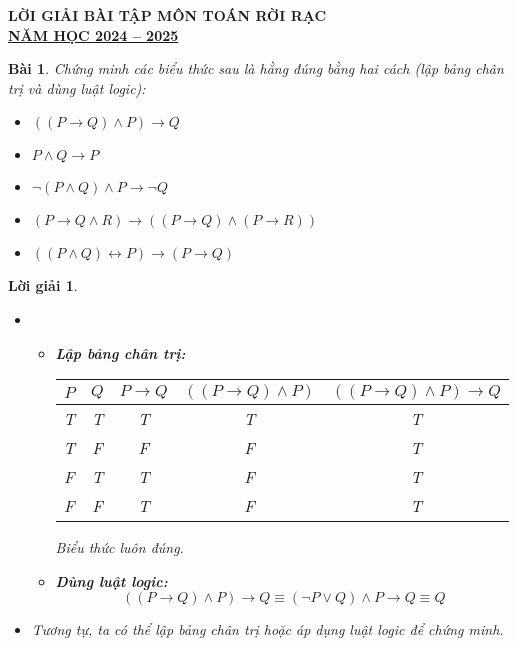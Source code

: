 \documentclass[11pt, oneside, a4paper]{article}
\newtheorem{bt}{Bài}[section]
\newtheorem{loigiai}{Lời giải}[bt]
\begin{document}
\begin{center}
    \Large \textbf{LỜI GIẢI BÀI TẬP MÔN TOÁN RỜI RẠC}\\
    \textbf{\underline{NĂM HỌC 2024 -- 2025}}\\
\end{center}

\tableofcontents
\newpage


\begin{bt}
Chứng minh các biểu thức sau là hằng đúng bằng hai cách (lập bảng chân trị và dùng luật logic): 
\begin{itemize}
    \item[a)] $((P \rightarrow Q) \land P) \rightarrow Q$
    \item[b)] $P \land Q \rightarrow P$
    \item[c)] $\lnot (P \land Q) \land P \rightarrow \lnot Q$
    \item[d)] $(P \rightarrow Q \land R) \rightarrow ((P \rightarrow Q) \land (P \rightarrow R))$
    \item[e)] $((P \land Q) \leftrightarrow P) \rightarrow (P \rightarrow Q)$
\end{itemize}
\end{bt}

\begin{loigiai}
\begin{itemize}
    \item[a)] 
    \begin{itemize}
        \item \textbf{Lập bảng chân trị:}
        \begin{center}
            \begin{tabular}{|c|c|c|c|c|}
                \hline
                $P$ & $Q$ & $P \rightarrow Q$ & $((P \rightarrow Q) \land P)$ & $((P \rightarrow Q) \land P) \rightarrow Q$ \\
                \hline
                T & T & T & T & T \\
                T & F & F & F & T \\
                F & T & T & F & T \\
                F & F & T & F & T \\
                \hline
            \end{tabular}
        \end{center}
        Biểu thức luôn đúng.
        \item \textbf{Dùng luật logic:}
        \[
        ((P \rightarrow Q) \land P) \rightarrow Q \equiv (\lnot P \lor Q) \land P \rightarrow Q \equiv Q
        \]
    \end{itemize}

    \item[b)] Tương tự, ta có thể lập bảng chân trị hoặc áp dụng luật logic để chứng minh.
\end{itemize}
\end{loigiai}

\newpage
\end{document}
